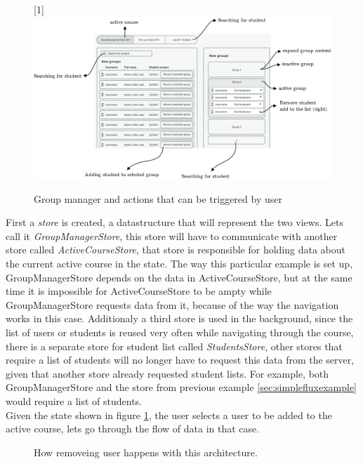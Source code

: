 \begin{figure}[h]
  \scalebox{1}[1]{{\includegraphics[width=1\linewidth]{graphics/advancedgroupmanager.png}}}
  \caption{Group manager and actions that can be triggered by user}
  \label{fig:advancedgroupmanager}
\end{figure}

First a \emph{store} is created, a datastructure that will represent the two views. Lets call it \emph{GroupManagerStore}, this store will have to communicate with another store called \emph{ActiveCourseStore}, that store is responsible for holding data about the current active course in the state. The way this particular example is set up, GroupManagerStore depends on the data in ActiveCourseStore, but at the same time it is impossible for ActiveCourseStore to be ampty while GroupManagerStore requests data from it, because of the way the navigation works in this case. Additionaly a third store is used in the background, since the list of users or students is reused very often while navigating through the course, there is a separate store for student list called \emph{StudentsStore}, other stores that require a list of students will no longer have to request this data from the server, given that another store already requested student lists. For example, both GroupManagerStore and the store from previous example \ref{sec:simplefluxexample} would require a list of students.
\\Given the state shown in figure \ref{fig:advancedgroupmanager}, the user selects a user to be added to the active course, lets go through the flow of data in that case.

\begin{figure}[h]
  \scalebox{0.8}{}
  \caption{How removeing user happens with this architecture.}
  \label{fig:advancedfluxaddstudent}
\end{figure}

